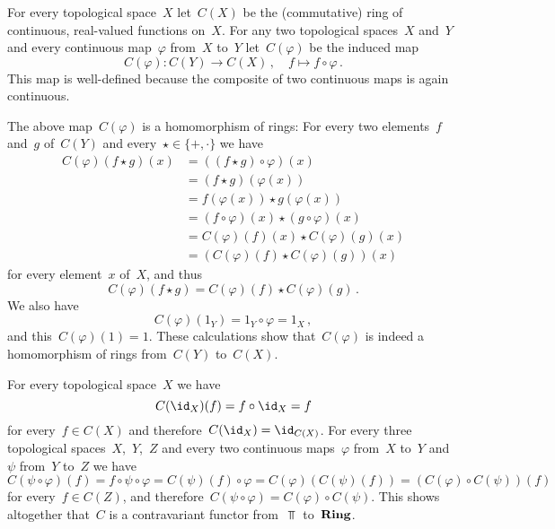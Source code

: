 \subsubsection{}

For every topological space~$X$ let~$C(X)$ be the (commutative) ring of continuous, real-valued functions on~$X$.
For any two topological spaces~$X$ and~$Y$ and every continuous map~$\varphi$ from~$X$ to~$Y$ let~$C(\varphi)$ be the induced map
\[
	C(\varphi)
	\colon
	C(Y)
	\to
	C(X) \,,
	\quad
	f
	\mapsto
	f \circ \varphi \,.
\]
This map is well-defined because the composite of two continuous maps is again continuous.

The above map~$C(\varphi)$ is a homomorphism of rings:
For every two elements~$f$ and~$g$ of~$C(Y)$ and every~$\star \in \{+, \cdot\}$ we have
\begin{align*}
	C(\varphi)(f \star g)(x)
	&=
	((f \star g) \circ \varphi)(x)
	\\
	&=
	(f \star g)(\varphi(x))
	\\
	&=
	f(\varphi(x)) \star g(\varphi(x))
	\\
	&=
	(f \circ \varphi)(x) \star (g \circ \varphi)(x)
	\\
	&=
	C(\varphi)(f)(x) \star C(\varphi)(g)(x)
	\\
	&=
	(C(\varphi)(f) \star C(\varphi)(g))(x)
\end{align*}
for every element~$x$ of~$X$, and thus
\[
	C(\varphi)(f \star g)
	=
	C(\varphi)(f) \star C(\varphi)(g) \,.
\]
We also have
\[
	C(\varphi)(1_Y)
	=
	1_Y \circ \varphi
	=
	1_X \,,
\]
and this~$C(\varphi)(1) = 1$.
These calculations show that~$C(\varphi)$ is indeed a homomorphism of rings from~$C(Y)$ to~$C(X)$.

For every topological space~$X$ we have
\[
	C(\id_X)(f)
	=
	f \circ \id_X
	=
	f
\]
for every~$f \in C(X)$ and therefore~$C(\id_X) = \id_{C(X)}$.
For every three topological spaces~$X$,~$Y$,~$Z$ and every two continuous maps~$\varphi$ from~$X$ to~$Y$ and~$\psi$ from~$Y$ to~$Z$ we have
\[
	C(\psi \circ \varphi)(f)
	=
	f \circ \psi \circ \varphi
	=
	C(\psi)(f) \circ \varphi
	=
	C(\varphi)( C(\psi)(f) )
	=
	( C(\varphi) \circ C(\psi) )(f)
\]
for every~$f \in C(Z)$, and therefore~$C(\psi \circ \varphi) = C(\varphi) \circ C(\psi)$.
This shows altogether that~$C$ is a contravariant functor from~$\Top$ to~$\mathbf{Ring}$.
